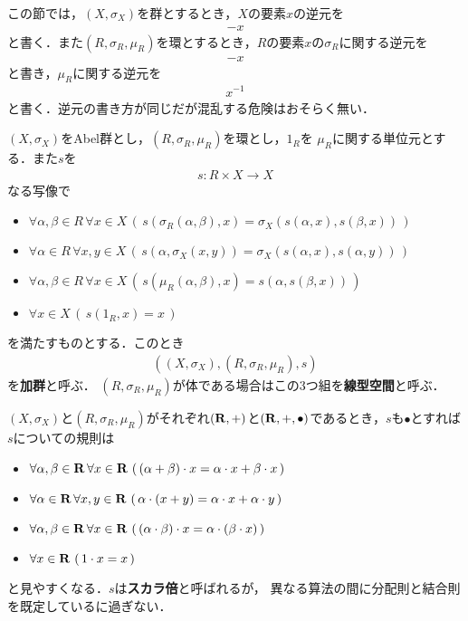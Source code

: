 	この節では，$\left(X,\sigma_X\right)$を群とするとき，$X$の要素$x$の逆元を
	\begin{align}
		-x
	\end{align}
	と書く．また$\left(R,\sigma_R,\mu_R\right)$を環とするとき，$R$の要素$x$の$\sigma_R$に関する逆元を
	\begin{align}
		-x
	\end{align}
	と書き，$\mu_R$に関する逆元を
	\begin{align}
		x^{-1}
	\end{align}
	と書く．逆元の書き方が同じだが混乱する危険はおそらく無い．
	
	\begin{screen}
		\begin{dfn}[加群]
			$(X,\sigma_X)$をAbel群とし，$(R,\sigma_R,\mu_R)$を環とし，$1_R$を
			$\mu_R$に関する単位元とする．また$s$を
			\begin{align}
				s:R \times X \longrightarrow X
			\end{align}
			なる写像で
			\begin{itemize}
				\item $\forall \alpha,\beta \in R\, \forall x \in X\, \left(\, s(\sigma_R(\alpha,\beta),x)
					= \sigma_X(s(\alpha,x),s(\beta,x))\, \right)$
				\item $\forall \alpha \in R\, \forall x,y \in X\, \left(\, s(\alpha,\sigma_X(x,y))
					= \sigma_X(s(\alpha,x),s(\alpha,y))\, \right)$
				\item $\forall \alpha,\beta \in R\, \forall x \in X\, \left(\, s(\mu_R(\alpha,\beta),x)
					= s(\alpha,s(\beta,x))\, \right)$
				\item $\forall x \in X\, \left(\, s(1_R,x) = x\, \right)$
			\end{itemize}
			を満たすものとする．このとき
			\begin{align}
				\left((X,\sigma_X),(R,\sigma_R,\mu_R),s\right)
			\end{align}
			を{\bf 加群}と呼ぶ．
			$(R,\sigma_R,\mu_R)$が体である場合はこの3つ組を{\bf 線型空間}と呼ぶ．
		\end{dfn}
	\end{screen}
	
	$(X,\sigma_X)$と$(R,\sigma_R,\mu_R)$がそれぞれ$(\mathbf{R},+)$と$(\mathbf{R},+,\bullet)$であるとき，$s$も$\bullet$とすれば
	$s$についての規則は
	\begin{itemize}
		\item $\forall \alpha,\beta \in \mathbf{R}\, \forall x \in \mathbf{R}\, \left(\, (\alpha + \beta) \cdot x
			= \alpha \cdot x + \beta \cdot x\, \right)$
		\item $\forall \alpha \in \mathbf{R}\, \forall x,y \in \mathbf{R}\, \left(\, \alpha \cdot (x+y)
			= \alpha \cdot x + \alpha \cdot y\, \right)$
		\item $\forall \alpha,\beta \in \mathbf{R}\, \forall x \in \mathbf{R}\, \left(\, (\alpha \cdot \beta) \cdot x
			= \alpha \cdot (\beta \cdot x)\, \right)$
		\item $\forall x \in \mathbf{R}\, \left(\, 1 \cdot x = x\, \right)$
	\end{itemize}
	と見やすくなる．$s$は{\bf スカラ倍}と呼ばれるが，
	異なる算法の間に分配則と結合則を既定しているに過ぎない．
	
